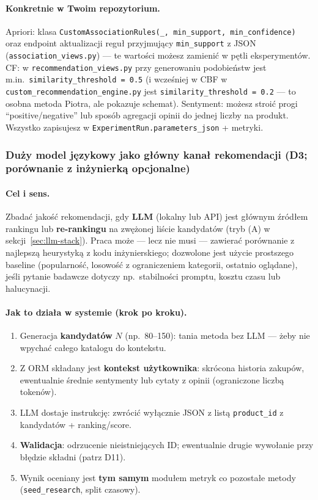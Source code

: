 \documentclass[a4paper,11pt]{article}
\newcommand{\code}[1]{\texttt{\small #1}}
\begin{document}
\paragraph{Konkretnie w Twoim repozytorium.}
Apriori: klasa \code{CustomAssociationRules(\_, min\_support, min\_confidence)} oraz endpoint aktualizacji reguł przyjmujący \code{min\_support} z JSON (\code{association\_views.py}) --- te wartości możesz zamienić w pętli eksperymentów. CF: w \code{recommendation\_views.py} przy generowaniu podobieństw jest m.in.\ \code{similarity\_threshold = 0.5} (i wcześniej w CBF w \code{custom\_recommendation\_engine.py} jest \code{similarity\_threshold = 0.2} --- to osobna metoda Piotra, ale pokazuje schemat). Sentyment: możesz stroić progi ``positive/negative'' lub sposób agregacji opinii do jednej liczby na produkt. Wszystko zapisujesz w \code{ExperimentRun.parameters\_json} + metryki.

\subsubsection{Duży model językowy jako główny kanał rekomendacji (\textbf{D3}; porównanie z inżynierką opcjonalne)}

\paragraph{Cel i sens.}
Zbadać jakość rekomendacji, gdy \textbf{LLM} (lokalny lub API) jest głównym źródłem rankingu lub \textbf{re-rankingu} na zwężonej liście kandydatów (tryb (A) w sekcji~\ref{sec:llm-stack}). Praca może --- lecz nie musi --- zawierać porównanie z najlepszą heurystyką z kodu inżynierskiego; dozwolone jest użycie prostszego baseline (popularność, losowość z ograniczeniem kategorii, ostatnio oglądane), jeśli pytanie badawcze dotyczy np.\ stabilności promptu, kosztu czasu lub halucynacji.

\paragraph{Jak to działa w systemie (krok po kroku).}
\begin{enumerate}[leftmargin=1.5em,itemsep=1pt]
  \item Generacja \textbf{kandydatów} $N$ (np.\ 80--150): tania metoda bez LLM --- żeby nie wpychać całego katalogu do kontekstu.
  \item Z ORM składany jest \textbf{kontekst użytkownika}: skrócona historia zakupów, ewentualnie średnie sentymenty lub cytaty z opinii (ograniczone liczbą tokenów).
  \item LLM dostaje instrukcję: zwrócić wyłącznie JSON z listą \code{product\_id} z kandydatów + ranking/score.
  \item \textbf{Walidacja}: odrzucenie nieistniejących ID; ewentualnie drugie wywołanie przy błędzie składni (patrz D11).
  \item Wynik oceniany jest \textbf{tym samym} modułem metryk co pozostałe metody (\texttt{seed\_research}, split czasowy).
\end{enumerate}
\end{document}
